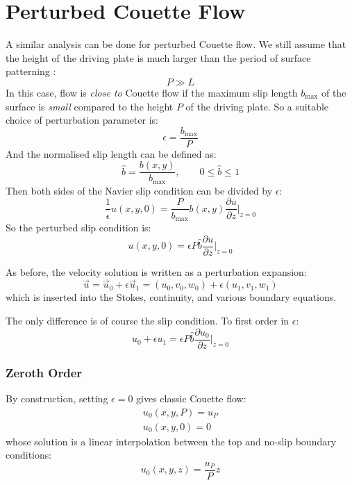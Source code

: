 \documentclass[12pt, a4paper, twoside, openright]{book}
\newcommand{\bmax}{\ensuremath{b_{\mathrm{max}}}}
\begin{document}
\section*{Perturbed Couette Flow}

A similar analysis can be done for perturbed Couette flow.  We still assume that the height of the driving plate is much larger than the period of surface patterning :
\begin{equation}
P \gg L
\end{equation}
In this case, flow is \emph{close to} Couette flow if the maximum slip length $\bmax$ of the surface is \emph{small} compared to the height $P$ of the driving plate.  So a suitable choice of perturbation parameter is:
\begin{equation}
\epsilon = \frac{\bmax}{P}
\end{equation} 
And the normalised slip length can be defined as:
\begin{equation}
\hat{b} = \frac{b(x,y)}{\bmax}, \qquad 0 \leq \hat{b} \leq 1
\end{equation}
Then both sides of the Navier slip condition can be divided by $\epsilon$:
\begin{equation}
\frac{1}{\epsilon} u(x,y,0) = \frac{P}{\bmax} b(x,y) \frac{\partial u}{\partial z} \rvert_{z=0}
\end{equation}
So the perturbed slip condition is:
\begin{equation}
u(x,y,0) = \epsilon P \hat{b} \frac{\partial u}{\partial z} \rvert_{z=0}
\end{equation}

As before, the velocity solution is written as a perturbation expansion:
\begin{equation}
\vec{u} = \vec{u}_0 + \epsilon \vec{u}_1 = (u_0, v_0, w_0) + \epsilon(u_1, v_1, w_1)
\end{equation}
which is inserted into the Stokes, continuity, and various boundary equations.

The only difference is of course the slip condition.  To first order in $\epsilon$:
\begin{equation}
u_0 + \epsilon u_1 = \epsilon P \hat{b} \frac{\partial u_0}{\partial z} \rvert_{z=0}
\end{equation}

\subsubsection*{Zeroth Order}

By construction, setting $\epsilon = 0$ gives classic Couette flow:
\begin{gather}
u_0(x,y,P) = u_P \\
u_0(x,y,0) = 0
\end{gather}
whose solution is a linear interpolation between the top and no-slip boundary conditions:
\begin{equation}
u_0(x,y,z) = \frac{u_P}{P} z
\end{equation}
\end{document}

